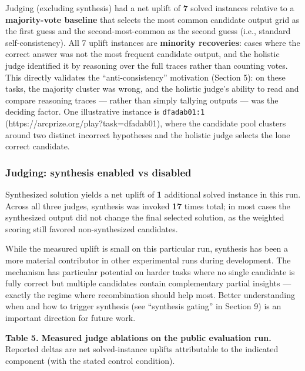 \documentclass[11pt]{article}
\begin{document}
Judging (excluding synthesis) had a net uplift of \textbf{7} solved
instances relative to a \textbf{majority-vote baseline} that selects the
most common candidate output grid as the first guess and the
second-most-common as the second guess (i.e., standard
self-consistency). All 7 uplift instances are \textbf{minority
recoveries}: cases where the correct answer was not the most frequent
candidate output, and the holistic judge identified it by reasoning over
the full traces rather than counting votes. This directly validates the
``anti-consistency'' motivation (Section 5): on these tasks, the
majority cluster was wrong, and the holistic judge's ability to read and
compare reasoning traces --- rather than simply tallying outputs --- was
the deciding factor. One illustrative instance is \texttt{dfadab01:1}
(https://arcprize.org/play?task=dfadab01), where the candidate pool
clusters around two distinct incorrect hypotheses and the holistic judge
selects the lone correct candidate.

\hypertarget{judging-synthesis-enabled-vs-disabled}{%
\subsubsection{Judging: synthesis enabled vs
disabled}\label{judging-synthesis-enabled-vs-disabled}}

Synthesized solution yields a net uplift of \textbf{1} additional solved
instance in this run. Across all three judges, synthesis was invoked
\textbf{17} times total; in most cases the synthesized output did not
change the final selected solution, as the weighted scoring still
favored non-synthesized candidates.

While the measured uplift is small on this particular run, synthesis has
been a more material contributor in other experimental runs during
development. The mechanism has particular potential on harder tasks
where no single candidate is fully correct but multiple candidates
contain complementary partial insights --- exactly the regime where
recombination should help most. Better understanding when and how to
trigger synthesis (see ``synthesis gating'' in Section 9) is an
important direction for future work.

\textbf{Table 5. Measured judge ablations on the public evaluation run.}
Reported deltas are net solved-instance uplifts attributable to the
indicated component (with the stated control condition).
\end{document}
